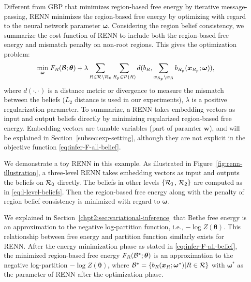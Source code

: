 Different from GBP that minimizes region-based free energy by iterative message-passing, RENN minimizes the region-based free energy by optimizing with regard to the neural network parameter $\bm{\omega}$.
Considering the region belief consistency, we summarize the cost function of RENN to include both the region-based free energy and mismatch penalty on non-root regions. This gives the optimization problem:
\begin{equation}\label{eq:infer-F-all-belief}
  \underset{\bm{\omega}}{\min}\;{F_R(\mathcal{B};\bm{\theta}) + \lambda \sum_{R\in \mathcal{R} \backslash \mathcal{R}_0} \sum_{R_p \in \mathcal{P}(R)} d( b_R, \sum_{\bm{x}_{R_p}\backslash \bm{x}_{R}} b_{R_p}(\bm{x}_{R_p}; \bm{\omega}))},
\end{equation}
where $d(\cdot, \cdot)$ is a distance metric or divergence to measure the mismatch between the beliefs ($L_2$ distance is used in our experiments), $\lambda$ is a positive regularization parameter. To summarize, a RENN takes embedding vectors as input and output beliefs directly by minimizing regularized region-based free energy. Embedding vectors are tunable variables (part of paramter $\bm{w}$), and will be explained in Section~\ref{subsec:exp-setting}, although they are not explicit in the objective function \eqref{eq:infer-F-all-belief}.


\begin{example}
  We demonstrate a toy RENN in this example. As illustrated in Figure~\ref{fig:renn-illustration}, a three-level RENN takes embedding vectors as input and outputs the beliefs on $\mathcal{R}_0$ directly. The beliefs in other levels $\{\mathcal{R}_1$, $\mathcal{R}_2\}$ are computed as in \eqref{eq:l-level-beliefs}. Then the region-based free energy along with the penalty of region belief consistency is minimized with regard to $\bm{\omega}$.
\end{example}

\begin{remark}
  We explained in Section~\ref{chpt2:sec:variational-inference} that Bethe free energy is an approximation to the negative log-partition function, i.e., $-\log{Z(\bm{\theta})}$. This relationship between free energy and partition function similarly exists for RENN.
  After the energy minimization phase as stated in \eqref{eq:infer-F-all-belief}, the minimized region-based free energy $F_R(\mathcal{B}^{\ast};\bm{\theta})$ is an approximation to the negative log-partition $-\log{Z(\bm{\bm{\theta}})}$, where $\mathcal{B}^{\ast} = \left\{b_R(\bm{x}_R;\bm{\omega}^{\ast})| R \in \mathcal{R} \right\}$ with $\bm{\omega}^{\ast}$ as the parameter of RENN after the optimization phase.
\end{remark}


